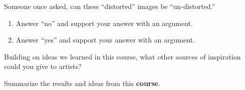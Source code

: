 \documentclass{ximera}
\begin{document}
\begin{problem}
  Someone once asked, can these ``distorted'' images be
  ``un-distorted.''
  \begin{enumerate}
  \item Answer ``no'' and support your answer with an argument.
  \item Answer ``yes'' and support your answer with an argument.
  \end{enumerate}
\end{problem}


\begin{problem}
  Building on ideas we learned in this course, what other sources of
  inspiration could you give to artists?
\end{problem}

\begin{problem}
Summarize the results and ideas from this \textbf{course}.
\begin{freeResponse}
\end{freeResponse}
\end{problem}
\end{document}
